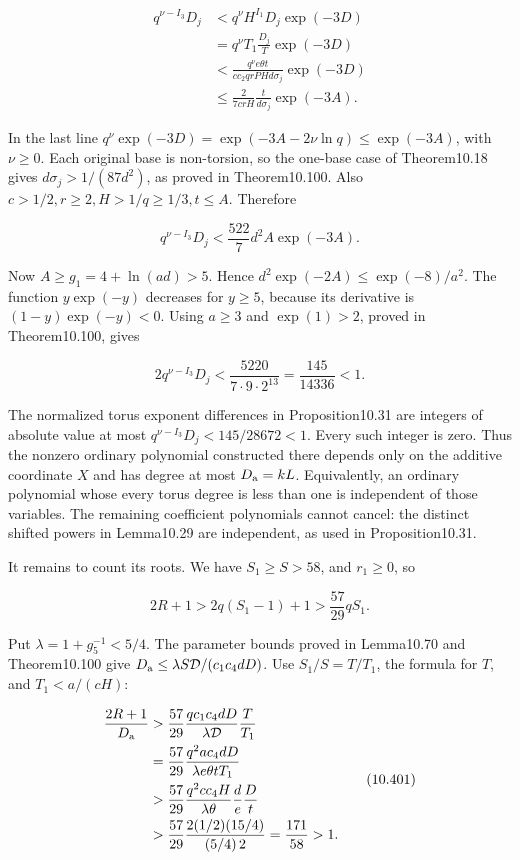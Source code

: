 \documentclass[
  11pt,
  a4paper,
]{article}
\begin{document}
\[
\begin{aligned}
q^{\nu-I_3}D_j
&<q^\nu H^{I_1}D_j\exp(-3D)\\
&=q^\nu T_1\frac{D_j}{T}\exp(-3D)\\
&<\frac{q^\nu e\theta t}{cc_2qrPHd\sigma_j}\exp(-3D)\\
&\le\frac{2}{7crH}\frac{t}{d\sigma_j}\exp(-3A).
\end{aligned}
\tag{10.397}
\]

In the last line \(q^\nu\exp(-3D)=\exp(-3A-2\nu\ln q)\le\exp(-3A)\),
with \(\nu\ge0\). Each original base is non-torsion, so the one-base
case of Theorem10.18 gives \(d\sigma_j>1/(87d^2)\), as proved in
Theorem10.100. Also \(c>1/2,r\ge2,H>1/q\ge1/3,t\le A\). Therefore

\[
q^{\nu-I_3}D_j<\frac{522}{7}d^2 A\exp(-3A).
\tag{10.398}
\]

Now \(A\ge g_1=4+\ln(ad)>5\). Hence \(d^2\exp(-2A)\le\exp(-8)/a^2\). The
function \(y\exp(-y)\) decreases for \(y\ge5\), because its derivative
is \((1-y)\exp(-y)<0\). Using \(a\ge3\) and \(\exp(1)>2\), proved in
Theorem10.100, gives

\[
2q^{\nu-I_3}D_j
<\frac{5220}{7\cdot9\cdot2^{13}}
=\frac{145}{14336}<1.
\tag{10.399}
\]

The normalized torus exponent differences in Proposition10.31 are
integers of absolute value at most \(q^{\nu-I_3}D_j<145/28672<1\). Every
such integer is zero. Thus the nonzero ordinary polynomial constructed
there depends only on the additive coordinate \(X\) and has degree at
most \(D_{\rm a}=kL\). Equivalently, an ordinary polynomial whose every
torus degree is less than one is independent of those variables. The
remaining coefficient polynomials cannot cancel: the distinct shifted
powers in Lemma10.29 are independent, as used in Proposition10.31.

It remains to count its roots. We have \(S_1\ge S>58\), and \(r_1\ge0\),
so

\[
2R+1>2q(S_1-1)+1>\frac{57}{29}qS_1.
\tag{10.400}
\]

Put \(\lambda=1+g_5^{-1}<5/4\). The parameter bounds proved in
Lemma10.70 and Theorem10.100 give
\(D_{\rm a}\le\lambda S\mathcal D/(c_1c_4dD)\). Use \(S_1/S=T/T_1\), the
formula for \(T\), and \(T_1<a/(cH)\):

\[
\begin{aligned}
\frac{2R+1}{D_{\rm a}}
&>\frac{57}{29}\frac{q c_1c_4dD}{\lambda\mathcal D}\frac{T}{T_1}\\
&=\frac{57}{29}\frac{q^2a c_4dD}{\lambda e\theta tT_1}\\
&>\frac{57}{29}\frac{q^2 c c_4H}{\lambda\theta}\frac d e\frac D t\\
&>\frac{57}{29}\frac{2(1/2)(15/4)}{(5/4)\,2}
=\frac{171}{58}>1.
\end{aligned}
\tag{10.401}
\]
\end{document}
